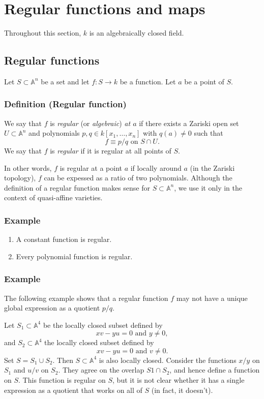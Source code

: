 \documentclass[11pt]{article}
\begin{document}
\section{Regular functions and maps}
\label{sec:orga1a1152}
Throughout this section, \(k\) is an algebraically closed field.

\subsection{Regular functions}
\label{sec:orge8e2d41}
Let \(S \subset \mathbb A^n\) be a set and let \(f \colon S \to k\) be a function.
Let \(a\) be a point of \(S\).

\subsubsection{Definition (Regular function)}
\label{sec:org99d2308}
We say that \(f\) is \emph{regular} (or \emph{algebraic}) \emph{at \(a\)} if there exists a Zariski open set \(U \subset \mathbb A^n\) and polynomials \(p, q \in k[x_1,\dots,x_n]\) with \(q(a) \neq 0\) such that
\[ f \equiv p/q \text{ on } S \cap U.\]
We say that \(f\) is \emph{regular} if it is regular at all points of \(S\).

In other words, \(f\) is regular at a point \(a\) if locally around \(a\) (in the Zariski topology), \(f\) can be expessed as a ratio of two polynomials.
Although the definition of a regular function makes sense for \(S \subset \mathbb A^n\), we use it only in the context of quasi-affine varieties.

\subsubsection{Example}
\label{sec:orga46cb52}
\begin{enumerate}
\item A constant function is regular.
\item Every polynomial function is regular.
\end{enumerate}
\subsubsection{Example}
\label{sec:org321ebbd}
The following example shows that a regular function \(f\) may not have a unique global expression as a quotient \(p/q\).

  Let \(S_1 \subset \mathbb A^4\) be the locally closed subset defined by
\[ xv - yu = 0 \text{ and } y \neq 0,\]
and \(S_2 \subset \mathbb A^4\) the locally closed subset defined by
\[ xv - yu = 0 \text{ and } v \neq 0.\]
Set \(S = S_1 \cup S_2\). Then \(S \subset \mathbb A^4\) is also locally closed.
Consider the functions \(x/y\) on \(S_1\) and \(u/v\) on \(S_2\).
They agree on the overlap \(S1 \cap S_2\), and hence define a function on \(S\).
This function is regular on \(S\), but it is not clear whether it has a single expression as a quotient that works on all of \(S\) (in fact, it doesn't).
\end{document}
